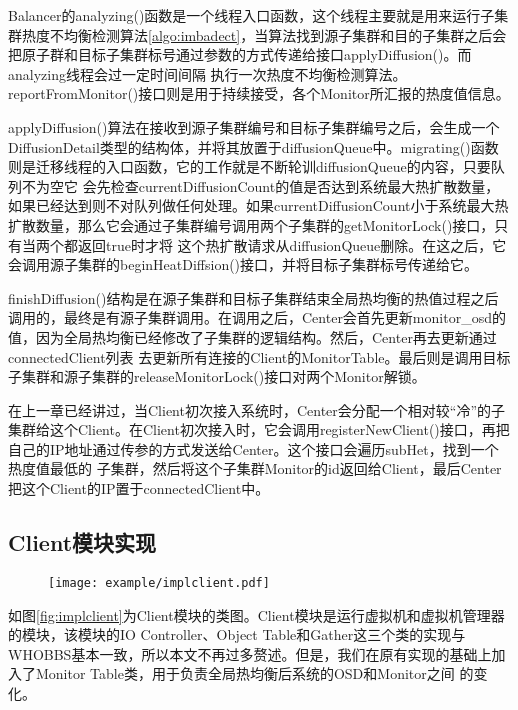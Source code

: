 Balancer的analyzing()函数是一个线程入口函数，这个线程主要就是用来运行子集群热度不均衡检测算法\ref{algo:imbadect}，当算法找到源子集群和目的子集群之后会把原子群和目标子集群标号通过参数的方式传递给接口applyDiffusion()。而analyzing线程会过一定时间间隔
执行一次热度不均衡检测算法。reportFromMonitor()接口则是用于持续接受，各个Monitor所汇报的热度值信息。

applyDiffusion()算法在接收到源子集群编号和目标子集群编号之后，会生成一个DiffusionDetail类型的结构体，并将其放置于diffusionQueue中。migrating()函数则是迁移线程的入口函数，它的工作就是不断轮训diffusionQueue的内容，只要队列不为空它
会先检查currentDiffusionCount的值是否达到系统最大热扩散数量，如果已经达到则不对队列做任何处理。如果currentDiffusionCount小于系统最大热扩散数量，那么它会通过子集群编号调用两个子集群的getMonitorLock()接口，只有当两个都返回true时才将
这个热扩散请求从diffusionQueue删除。在这之后，它会调用源子集群的beginHeatDiffsion()接口，并将目标子集群标号传递给它。

finishDiffusion()结构是在源子集群和目标子集群结束全局热均衡的热值过程之后调用的，最终是有源子集群调用。在调用之后，Center会首先更新monitor\_osd的值，因为全局热均衡已经修改了子集群的逻辑结构。然后，Center再去更新通过connectedClient列表
去更新所有连接的Client的MonitorTable。最后则是调用目标子集群和源子集群的releaseMonitorLock()接口对两个Monitor解锁。

在上一章已经讲过，当Client初次接入系统时，Center会分配一个相对较“冷”的子集群给这个Client。在Client初次接入时，它会调用registerNewClient()接口，再把自己的IP地址通过传参的方式发送给Center。这个接口会遍历subHet，找到一个热度值最低的
子集群，然后将这个子集群Monitor的id返回给Client，最后Center把这个Client的IP置于connectedClient中。

\subsection{Client模块实现}
\begin{figure}[!htp]
    \centering
    \texttt{[image: example/implclient.pdf]}
\end{figure}

如图\ref{fig:implclient}为Client模块的类图。Client模块是运行虚拟机和虚拟机管理器的模块，该模块的IO Controller、Object Table和Gather这三个类的实现与WHOBBS基本一致，所以本文不再过多赘述。但是，我们在原有实现的基础上加入了Monitor Table类，用于负责全局热均衡后系统的OSD和Monitor之间
的变化。

